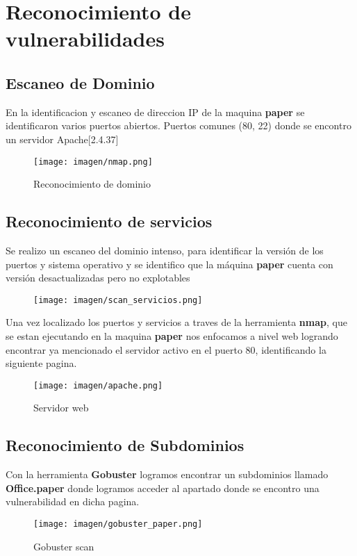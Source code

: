 \documentclass[a4paper]{article} %
\newcommand{\Maquina}{paper} %
\begin{document}
    \vspace{16.5cm}
    \section{\textbf{Reconocimiento de vulnerabilidades}}
    \vspace{0.3cm}
    \subsection{Escaneo de Dominio}
    En la identificacion y escaneo de direccion IP de la maquina  \textbf{\Maquina} se identificaron varios puertos abiertos. Puertos comunes (80, 22) donde se encontro 
    un servidor Apache[2.4.37]
    \vspace{0.5cm}
    \begin{figure}[h]
        \centering
        \texttt{[image: imagen/nmap.png]}
        \caption{Reconocimiento de dominio}
    \end{figure}
    \subsection{Reconocimiento de servicios}
    Se realizo un escaneo del dominio intenso, para identificar la versión de los puertos y sistema operativo
    y se identifico que la máquina \textbf{\Maquina} cuenta con versión desactualizadas pero no explotables
\begin{figure}[h]
    \begin{center}
        \texttt{[image: imagen/scan\_servicios.png]}
    \end{center}
    
\end{figure}
\vspace{0.5cm}
    Una vez localizado los puertos y servicios a traves de la herramienta \textbf{nmap}, que se estan ejecutando en la maquina \textbf{\Maquina} nos enfocamos a nivel web 
logrando encontrar ya mencionado el servidor activo en el puerto 80, identificando la siguiente pagina.
\vspace{0.5cm}
\begin{figure}[h]
    \centering
    \texttt{[image: imagen/apache.png]}
    \caption{Servidor web}
    \vspace{0.5cm}  
\end{figure}
\subsection{Reconocimiento de Subdominios}
Con la herramienta \textbf{Gobuster} logramos encontrar un subdominios llamado \textbf{Office.paper} donde logramos acceder al apartado donde se encontro una vulnerabilidad en dicha pagina.
\vspace{0.5cm}
\begin{figure}[h]
    \centering
    \texttt{[image: imagen/gobuster\_paper.png]} 
    \caption{Gobuster scan}

\end{figure}
\end{document}

